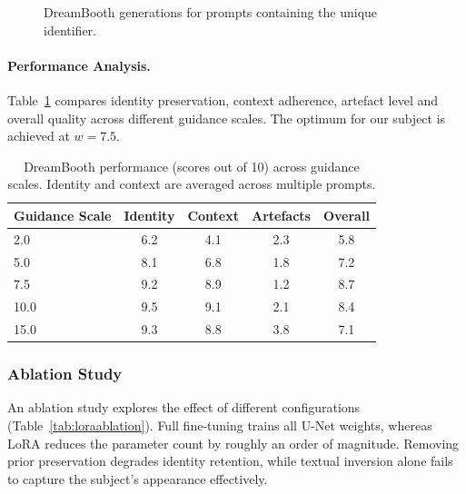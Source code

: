\begin{figure}[H]
  \centering
  \caption{DreamBooth generations for prompts containing the unique
    identifier.}
  \label{fig:dreamgrid}
\end{figure}

\paragraph{Performance Analysis.}  Table~\ref{tab:dreamanalysis}
compares identity preservation, context adherence, artefact level and
overall quality across different guidance scales.  The optimum for our
subject is achieved at $w=7.5$.

\begin{table}[H]
  \centering
  \begin{tabular}{lcccc}
    \toprule
    Guidance Scale & Identity & Context & Artefacts & Overall \\
    \midrule
     2.0 & 6.2 & 4.1 & 2.3 & 5.8 \\
     5.0 & 8.1 & 6.8 & 1.8 & 7.2 \\
     7.5 & 9.2 & 8.9 & 1.2 & 8.7 \\
    10.0 & 9.5 & 9.1 & 2.1 & 8.4 \\
    15.0 & 9.3 & 8.8 & 3.8 & 7.1 \\
    \bottomrule
  \end{tabular}
  \caption{DreamBooth performance (scores out of 10) across guidance
    scales.  Identity and context are averaged across multiple
    prompts.}
  \label{tab:dreamanalysis}
\end{table}

\subsubsection{Ablation Study}

An ablation study explores the effect of different configurations
(Table~\ref{tab:loraablation}).  Full fine-tuning trains all U-Net
weights, whereas LoRA reduces the parameter count by roughly an order
of magnitude.  Removing prior preservation degrades identity
retention, while textual inversion alone fails to capture the
subject’s appearance effectively.

